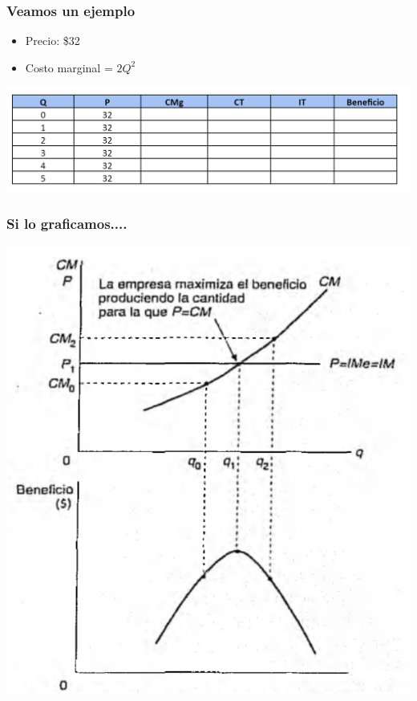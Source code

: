 \documentclass{beamer}
\begin{document}
\begin{frame}
\frametitle{Veamos un ejemplo}
\begin{itemize}
    \item Precio: \$32
    \item Costo marginal = $2Q^{2}$
\end{itemize}
\centering
\includegraphics[scale=0.7]{Slides Principios de Economia/Figures/Ejemplo Competencia Perfecta.png}
\end{frame}

\begin{frame}
\frametitle{Si lo graficamos....}
\centering
\includegraphics[scale=0.85]{Slides Principios de Economia/Figures/BeneficiosCP.png}
\end{frame}
\end{document}
